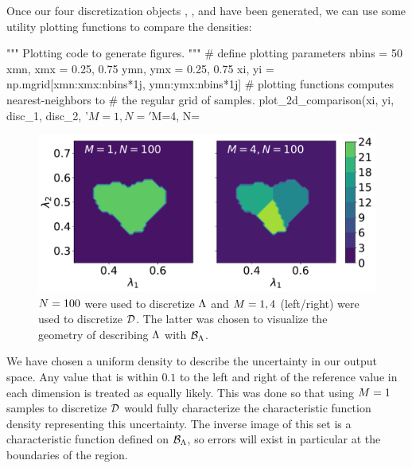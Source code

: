 Once our four discretization objects , ,  and  have been generated, we can use some utility plotting functions to compare the densities:

\begin{python}
"""
Plotting code to generate figures.
"""
# define plotting parameters
nbins = 50
xmn, xmx = 0.25, 0.75
ymn, ymx = 0.25, 0.75
xi, yi = np.mgrid[xmn:xmx:nbins*1j, ymn:ymx:nbins*1j]
# plotting functions computes nearest-neighbors to
# the regular grid of samples.
plot_2d_comparison(xi, yi, disc_1, disc_2,
                   '$M=1, N=%
                   '$M=4, N=%
\end{python}

\begin{figure}[ht]
\begin{minipage}{.975\textwidth}
  \includegraphics[width=\linewidth]{./examples/identity/set/M1-N100_N100-vs-M4-N100_N100.pdf}
\end{minipage}
\caption{
$N=100$ were used to discretize ${\Lambda}$ and $M=1, 4$ (left/right) were used to discretize $\mathcal{D}$.
The latter was chosen to visualize the geometry of describing ${\Lambda}$ with $\mathcal{B}_{{\Lambda}}$.
}
\label{fig:ex:identity_set_1E2}
\end{figure}

We have chosen a uniform density to describe the uncertainty in our output space.
Any value that is within $0.1$ to the left and right of the reference value  in each dimension is treated as equally likely.
This was done so that using $M = 1$ samples to discretize $\mathcal{D}$ would fully characterize the characteristic function density representing this uncertainty.
The inverse image of this set is a characteristic function defined on $\mathcal{B}_{{\Lambda}}$, so errors will exist in particular at the boundaries of the region.

